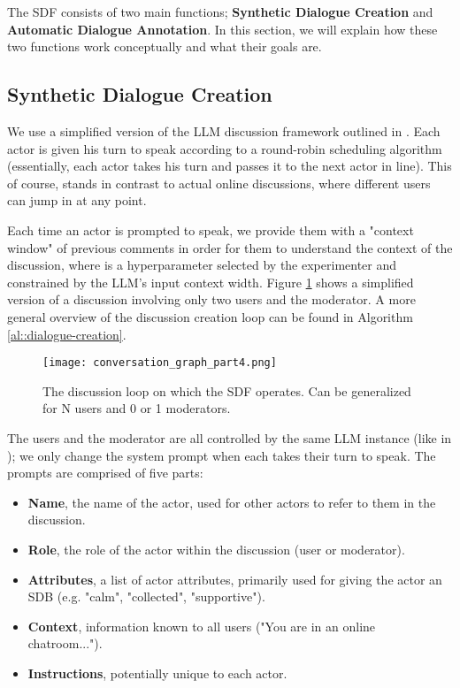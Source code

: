 The \ac{SDF} consists of two main functions; \textbf{Synthetic Dialogue Creation} and \textbf{Automatic Dialogue Annotation}. In this section, we will explain how these two functions work conceptually and what their goals are.


\subsection{Synthetic Dialogue Creation}
\label{ssec:system:creation}

We use a simplified version of the LLM discussion framework outlined in \citet{abdelnabi2024cooperationcompetitionmaliciousnessllmstakeholders}. Each actor is given his turn to speak according to a round-robin scheduling algorithm (essentially, each actor takes his turn and passes it to the next actor in line). This of course, stands in contrast to actual online discussions, where different users can jump in at any point.

Each time an actor is prompted to speak, we provide them with a "context window" of  previous comments in order for them to understand the context of the discussion, where  is a hyperparameter selected by the experimenter and constrained by the LLM's input context width. Figure \ref{fig::conversation} shows a simplified version of a discussion involving only two users and the moderator. A more general overview of the discussion creation loop can be found in Algorithm \ref{al::dialogue-creation}.


\begin{figure}
	\centering
	\texttt{[image: conversation\_graph\_part4.png]}
	\caption{The discussion loop on which the \ac{SDF} operates. Can be generalized for N users and 0 or 1 moderators.}
	\label{fig::conversation}
\end{figure}

The users and the moderator are all controlled by the same LLM instance (like in \citet{park2022socialsimulacracreatingpopulated}); we only change the system prompt when each takes their turn to speak. The prompts are comprised of five parts:

\begin{itemize}
	\item \textbf{Name}, the name of the actor, used for other actors to refer to them in the discussion.
	\item \textbf{Role}, the role of the actor within the discussion (user or moderator).
	\item \textbf{Attributes}, a list of actor attributes, primarily used for giving the actor an \ac{SDB} (e.g. "calm", "collected", "supportive").
	\item \textbf{Context}, information known to all users ("You are in an online chatroom...").
	\item \textbf{Instructions}, potentially unique to each actor. 
\end{itemize}


